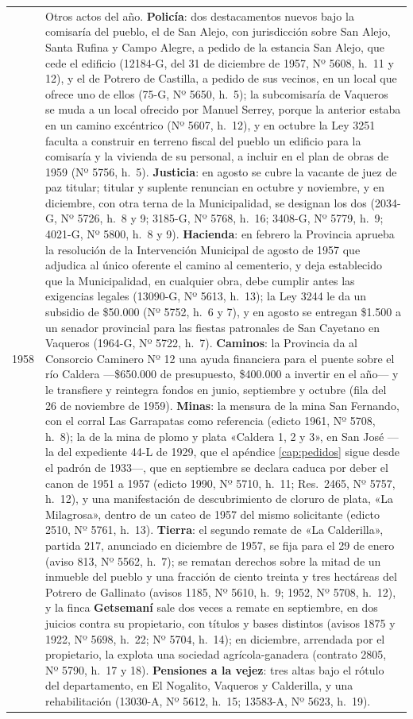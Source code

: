 \begin{longtable}{@{}p{2.7cm}p{10.3cm}@{}}
1958 & Otros actos del año. \textbf{Policía}: dos destacamentos nuevos bajo la comisaría del pueblo, el de San Alejo, con jurisdicción sobre San Alejo, Santa Rufina y Campo Alegre, a pedido de la estancia San Alejo, que cede el edificio (12184-G, del 31 de diciembre de 1957, Nº 5608, h.\ 11 y 12), y el de Potrero de Castilla, a pedido de sus vecinos, en un local que ofrece uno de ellos (75-G, Nº 5650, h.\ 5); la subcomisaría de Vaqueros se muda a un local ofrecido por Manuel Serrey\index{Serrey, Manuel}, porque la anterior estaba en un camino excéntrico (Nº 5607, h.\ 12), y en octubre la Ley 3251 faculta a construir en terreno fiscal del pueblo un edificio para la comisaría y la vivienda de su personal, a incluir en el plan de obras de 1959 (Nº 5756, h.\ 5). \textbf{Justicia}: en agosto se cubre la vacante de juez de paz titular; titular y suplente renuncian en octubre y noviembre, y en diciembre, con otra terna de la Municipalidad, se designan los dos (2034-G, Nº 5726, h.\ 8 y 9; 3185-G, Nº 5768, h.\ 16; 3408-G, Nº 5779, h.\ 9; 4021-G, Nº 5800, h.\ 8 y 9). \textbf{Hacienda}: en febrero la Provincia aprueba la resolución de la Intervención Municipal de agosto de 1957 que adjudica al único oferente el camino al cementerio, y deja establecido que la Municipalidad, en cualquier obra, debe cumplir antes las exigencias legales (13090-G, Nº 5613, h.\ 13); la Ley 3244 le da un subsidio de \$50.000 (Nº 5752, h.\ 6 y 7), y en agosto se entregan \$1.500 a un senador provincial para las fiestas patronales de San Cayetano en Vaqueros (1964-G, Nº 5722, h.\ 7). \textbf{Caminos}: la Provincia da al Consorcio Caminero Nº 12 una ayuda financiera para el puente sobre el río Caldera ---\$650.000 de presupuesto, \$400.000 a invertir en el año--- y le transfiere y reintegra fondos en junio, septiembre y octubre (fila del 26 de noviembre de 1959). \textbf{Minas}: la mensura de la mina San Fernando, con el corral Las Garrapatas como referencia (edicto 1961, Nº 5708, h.\ 8); la de la mina de plomo y plata «Caldera 1, 2 y 3», en San José ---la del expediente 44-L de 1929, que el apéndice \ref{cap:pedidos} sigue desde el padrón de 1933---, que en septiembre se declara caduca por deber el canon de 1951 a 1957 (edicto 1990, Nº 5710, h.\ 11; Res.\ 2465, Nº 5757, h.\ 12), y una manifestación de descubrimiento de cloruro de plata, «La Milagrosa», dentro de un cateo de 1957 del mismo solicitante (edicto 2510, Nº 5761, h.\ 13). \textbf{Tierra}: el segundo remate de «La Calderilla», partida 217, anunciado en diciembre de 1957, se fija para el 29 de enero (aviso 813, Nº 5562, h.\ 7); se rematan derechos sobre la mitad de un inmueble del pueblo y una fracción de ciento treinta y tres hectáreas del Potrero de Gallinato (avisos 1185, Nº 5610, h.\ 9; 1952, Nº 5708, h.\ 12), y la finca \textbf{Getsemaní} sale dos veces a remate en septiembre, en dos juicios contra su propietario, con títulos y bases distintos (avisos 1875 y 1922, Nº 5698, h.\ 22; Nº 5704, h.\ 14); en diciembre, arrendada por el propietario, la explota una sociedad agrícola-ganadera (contrato 2805, Nº 5790, h.\ 17 y 18). \textbf{Pensiones a la vejez}: tres altas bajo el rótulo del departamento, en El Nogalito, Vaqueros y Calderilla, y una rehabilitación (13030-A, Nº 5612, h.\ 15; 13583-A, Nº 5623, h.\ 19). \\

\end{longtable}
